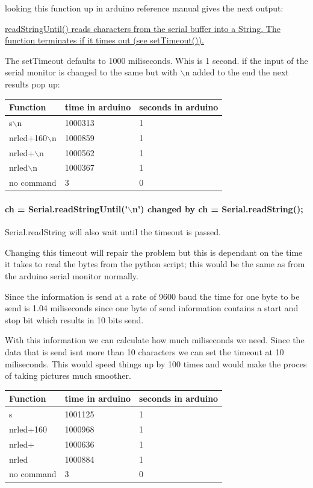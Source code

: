 \documentclass{article}
\begin{document}
looking this function up in arduino reference manual gives the next output:

\uline{readStringUntil() reads characters from the serial buffer into a String. The function terminates if it times out (see setTimeout()).}



The setTimeout defaults to 1000 miliseconds. Whis is 1 second. if the input of the serial monitor is changed to the same but with $\backslash$n added to the end the next results pop up:

\begin{tabular}{ |l|l|l| }
\hline
 Function & time in arduino & seconds in arduino \tabularnewline
\hline
\hline
 s$\backslash$n & 1000313 & 1 \tabularnewline
\hline
 nrled+160$\backslash$n & 1000859 & 1 \tabularnewline
\hline
 nrled+$\backslash$n & 1000562 & 1 \tabularnewline
\hline
 nrled$\backslash$n & 1000367 & 1 \tabularnewline
\hline
 no command & 3 & 0 \tabularnewline
\hline
\end{tabular}




\paragraph{ch = Serial.readStringUntil('$\backslash$n') changed by  ch = Serial.readString();}

Serial.readString will also wait until the timeout is passed. 

Changing this timeout will repair the problem but this is dependant on the time it takes to read the bytes from the python script; this would be the same as from the arduino serial monitor normally.

Since the information is send at a rate of 9600 baud the time for one byte to be send is 1.04 miliseconds since one byte of send information contains a start and stop bit which results in 10 bits send.

With this information we can calculate how much miliseconds we need. Since the data that is send isnt more than 10 characters we can set the timeout at 10 miliseconds. This would speed things up by 100 times and would make the proces of taking pictures much smoother.



\begin{tabular}{ |l|l|l| }
\hline
 Function & time in arduino & seconds in arduino \tabularnewline
\hline
\hline
 s & 1001125 & 1 \tabularnewline
\hline
 nrled+160 & 1000968 & 1 \tabularnewline
\hline
 nrled+ & 1000636 & 1 \tabularnewline
\hline
 nrled & 1000884 & 1 \tabularnewline
\hline
 no command & 3 & 0 \tabularnewline
\hline
\end{tabular}
\end{document}
